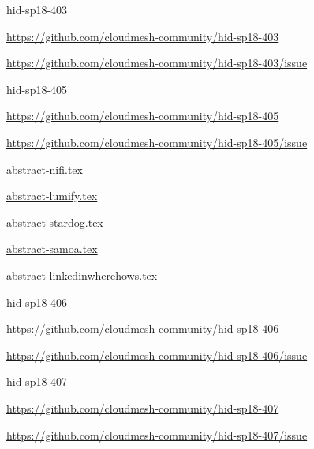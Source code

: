 \begin{IU}

hid-sp18-403

\url{https://github.com/cloudmesh-community/hid-sp18-403}

\url{https://github.com/cloudmesh-community/hid-sp18-403/issue}

\end{IU}


\begin{IU}

hid-sp18-405

\url{https://github.com/cloudmesh-community/hid-sp18-405}

\url{https://github.com/cloudmesh-community/hid-sp18-405/issue}

\href{https://github.com/cloudmesh-community/hid-sp18-405/blob/master//technology/abstract-nifi.tex}{abstract-nifi.tex}

\href{https://github.com/cloudmesh-community/hid-sp18-405/blob/master//technology/abstract-lumify.tex}{abstract-lumify.tex}

\href{https://github.com/cloudmesh-community/hid-sp18-405/blob/master//technology/abstract-stardog.tex}{abstract-stardog.tex}

\href{https://github.com/cloudmesh-community/hid-sp18-405/blob/master//technology/abstract-samoa.tex}{abstract-samoa.tex}

\href{https://github.com/cloudmesh-community/hid-sp18-405/blob/master//technology/abstract-linkedinwherehows.tex}{abstract-linkedinwherehows.tex}

\end{IU}


\begin{IU}

hid-sp18-406

\url{https://github.com/cloudmesh-community/hid-sp18-406}

\url{https://github.com/cloudmesh-community/hid-sp18-406/issue}

\end{IU}


\begin{IU}

hid-sp18-407

\url{https://github.com/cloudmesh-community/hid-sp18-407}

\url{https://github.com/cloudmesh-community/hid-sp18-407/issue}

\end{IU}


